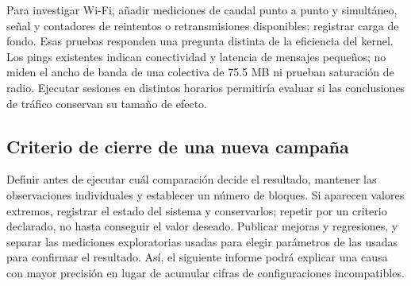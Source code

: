 Para investigar Wi-Fi, añadir mediciones de caudal punto a punto y simultáneo, señal y contadores de reintentos o retransmisiones disponibles; registrar carga de fondo. Esas pruebas responden una pregunta distinta de la eficiencia del kernel. Los pings existentes indican conectividad y latencia de mensajes pequeños; no miden el ancho de banda de una colectiva de 75.5 MB ni prueban saturación de radio. Ejecutar sesiones en distintos horarios permitiría evaluar si las conclusiones de tráfico conservan su tamaño de efecto.

\subsection{Criterio de cierre de una nueva campaña}

Definir antes de ejecutar cuál comparación decide el resultado, mantener las observaciones individuales y establecer un número de bloques. Si aparecen valores extremos, registrar el estado del sistema y conservarlos; repetir por un criterio declarado, no hasta conseguir el valor deseado. Publicar mejoras y regresiones, y separar las mediciones exploratorias usadas para elegir parámetros de las usadas para confirmar el resultado. Así, el siguiente informe podrá explicar una causa con mayor precisión en lugar de acumular cifras de configuraciones incompatibles.
